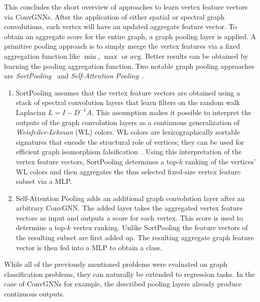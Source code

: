 \documentclass[12pt]{scrartcl}
\begin{document}
\begin{enumerate}[label=\textbf{\arabic*.}]
		This concludes the short overview of approaches to learn vertex feature vectors via ConvGNNs.
		After the application of either spatial or spectral graph convolutions, each vertex will have an updated aggregate feature vector.
		To obtain an aggregate score for the entire graph, a graph pooling layer is applied.
		A primitive pooling approach is to simply merge the vertex features via a fixed aggregation function like $\min$, $\max$ or $\text{avg}$.
		Better results can be obtained by learning the pooling aggregation function.
		Two notable graph pooling approaches are \textit{SortPooling}~\cite{Zhang2018} and \textit{Self-Attention Pooling}~\cite{Lee2019}.
		\begin{enumerate}
			\item SortPooling assumes that the vertex feature vectors are obtained using a stack of spectral convolution layers that learn filters on the random walk Laplacian $L = I - D^{-1} A$.
				This assumption makes it possible to interpret the outputs of the graph convolution layers as a continuous generalization of \textit{Weisfeiler-Lehman} (WL) colors.
				WL colors are lexicographically sortable signatures that encode the structural role of vertices; they can be used for efficient graph isomorphism falsification~\cite{Weisfeiler1968}.
				Using this interpretation of the vertex feature vectors, SortPooling determines a top-$k$ ranking of the vertices' WL colors and then aggregates the thus selected fixed-size vertex feature subset via a MLP.\@
			\item Self-Attention Pooling adds an additional graph convolution layer after an arbitrary ConvGNN.\@
				The added layer takes the aggregated vertex feature vectors as input and outputs a score for each vertex.
				This score is used to determine a top-$k$ vertex ranking.
				Unlike SortPooling the feature vectors of the resulting subset are first added up.
				The resulting aggregate graph feature vector is then fed into a MLP to obtain a class.
		\end{enumerate}
\end{enumerate}

While all of the previously mentioned problems were evaluated on graph classification problems, they can naturally be extended to regression tasks.
In the case of ConvGNNs for example, the described pooling layers already produce continuous outputs.
\end{document}
